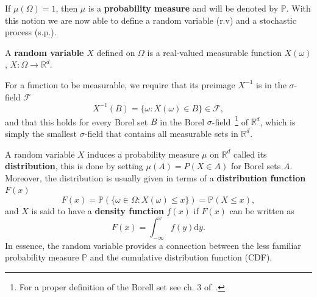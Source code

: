 If $\mu(\Omega)=1$, then $\mu$ is a \textbf{probability measure} and will be denoted by $\mathbb{P}$. With this notion we are now able to define a random variable (r.v) and a stochastic process (s.p.).
\begin{definition}
	 A \textbf{random variable} $X$ defined on $\Omega$ is a real-valued measurable function $X(\omega)$, $X: \Omega \rightarrow \mathbb{R}^d$.
\end{definition}
For a function to be measurable, we require that its preimage $X^{-1}$ is in the $\sigma$-field $\mathcal{F}$
\begin{equation}
	X^{-1}(B) = \{ \omega : X(\omega) \in B \} \in \mathcal{F},
\end{equation}
and that this holds for every Borel set $B$ in the Borel $\sigma$-field~\footnote{For a proper definition of the Borell set see ch. 3 of~\cite{salamon2016measure}.} of $\mathbb{R}^d$, which is simply the smallest $\sigma$-field that contains all measurable sets in $\mathbb{R}^d$. 

A random variable $X$ induces a probability measure $\mu$ on $\mathbb{R}^d$ called its \textbf{distribution}, this is done by setting $\mu(A)=P(X \in A)$ for Borel sets $A$. Moreover, the distribution is usually given in terms of a \textbf{distribution function} $F(x)$
\begin{equation}
	 F(x) = \mathbb{P}(\{\omega \in \Omega: X(\omega) \leq x\}) = \mathbb{P}(X \leq x),
\end{equation}
and $X$ is said to have a \textbf{density function} $f(x)$ if $F(x)$ can be written as 
\begin{equation}
	\label{eq:pdf}
	F(x)=\int_{-\infty}^{x} f(y) \mathrm{d}y. 
\end{equation}
In essence, the random variable provides a connection between the less familiar probability measure $\mathbb{P}$ and the cumulative distribution function (CDF).

